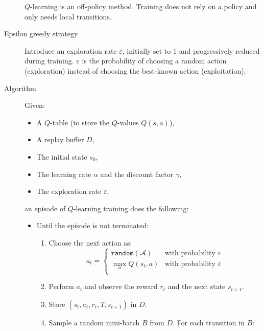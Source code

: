 \begin{description}
        \begin{remark}
            $Q$-learning is an off-policy method. Training does not rely on a policy and only needs local transitions.
        \end{remark}

    \item[Epsilon greedy strategy] 
        Introduce an exploration rate $\varepsilon$, initially set to 1 and progressively reduced during training.
        $\varepsilon$ is the probability of choosing a random action (exploration) instead of choosing the best-known action (exploitation).

    \item[Algorithm] 
        Given:
        \begin{itemize}
            \item A $Q$-table (to store the $Q$-values $Q(s, a)$), 
            \item A replay buffer $D$,
            \item The initial state $s_0$,
            \item The learning rate $\alpha$ and the discount factor $\gamma$,
            \item The exploration rate $\varepsilon$, 
        \end{itemize}
        an episode of $Q$-learning training does the following:
        \begin{itemize}
            \item Until the episode is not terminated:
            \begin{enumerate}
                \item Choose the next action as:
                    \[ a_t = \begin{cases}
                        \texttt{random}(\mathcal{A}) & \text{with probability $\varepsilon$} \\
                        \max_a Q(s_t, a) & \text{with probability $\varepsilon$} \\
                    \end{cases} \]
                \item Perform $a_t$ and observe the reward $r_t$ and the next state $s_{t+1}$.
                \item Store $(s_t, a_t, r_t, T, s_{t+1})$ in $D$.
                \item Sample a random mini-batch $B$ from $D$. For each transition in $B$:
                \begin{enumerate}

\end{enumerate}
\end{enumerate}
\end{itemize}
\end{description}
